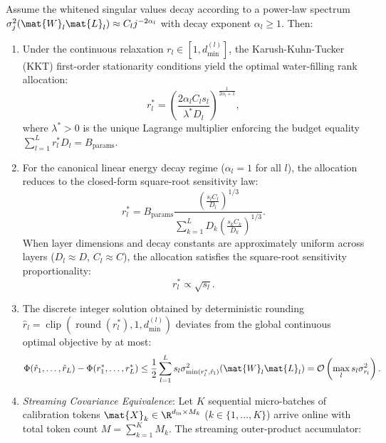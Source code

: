 \begin{theorem}
Assume the whitened singular values decay according to a power-law spectrum $\sigma_j^2(\mat{W}_l \mat{L}_l) \approx C_l j^{-2\alpha_l}$ with decay exponent $\alpha_l \ge 1$.
Then:
\begin{enumerate}
    \item Under the continuous relaxation $r_l \in [1, d_{\min}^{(l)}]$, the Karush-Kuhn-Tucker (KKT) first-order stationarity conditions yield the optimal water-filling rank allocation:
    \begin{equation}
    r_l^* = \left( \frac{2 \alpha_l C_l s_l}{\lambda^* D_l} \right)^{\frac{1}{2\alpha_l + 1}},
    \label{app:eq:asvd_water_filling_general}
    \end{equation}
    where $\lambda^* > 0$ is the unique Lagrange multiplier enforcing the budget equality $\sum_{l=1}^L r_l^* D_l = B_{\text{params}}$.
    \item For the canonical linear energy decay regime ($\alpha_l = 1$ for all $l$), the allocation reduces to the closed-form square-root sensitivity law:
    \begin{equation}
    r_l^* = B_{\text{params}} \frac{\left( \frac{s_l C_l}{D_l} \right)^{1/3}}{\sum_{k=1}^L D_k \left( \frac{s_k C_k}{D_k} \right)^{1/3}}.
    \label{eq:asvd_squareroot_law}
    \end{equation}
    When layer dimensions and decay constants are approximately uniform across layers ($D_l \approx D$, $C_l \approx C$), the allocation satisfies the square-root sensitivity proportionality:
    \begin{equation}
    r_l^* \propto \sqrt{s_l}.
    \label{app:eq:asvd_sensitivity_sqrt_simple}
    \end{equation}
    \item The discrete integer solution obtained by deterministic rounding $\hat{r}_l = \operatorname{clip}(\operatorname{round}(r_l^*), 1, d_{\min}^{(l)})$ deviates from the global continuous optimal objective by at most:
    \begin{equation}
    \Phi(\hat{r}_1, \dots, \hat{r}_L) - \Phi(r_1^*, \dots, r_L^*) \le \frac{1}{2} \sum_{l=1}^L s_l \sigma_{\min(r_l^*, \hat{r}_l)}^2(\mat{W}_l \mat{L}_l) = \mathcal{O}\left( \max_{l} s_l \sigma_{r_l}^2 \right).
    \label{app:eq:asvd_rounding_bound}
    \end{equation}
    \item \emph{Streaming Covariance Equivalence}: Let $K$ sequential micro-batches of calibration tokens $\mat{X}_k \in \R^{d_{\text{in}} \times M_k}$ ($k \in \{1, \dots, K\}$) arrive online with total token count $M = \sum_{k=1}^K M_k$. The streaming outer-product accumulator:

\end{enumerate}
\end{theorem}
